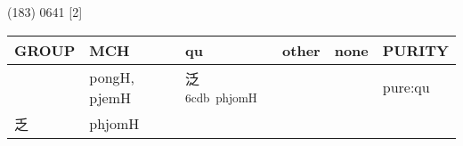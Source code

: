 \documentclass[14pt,a4paper]{scrartcl}
\begin{document}
(183) 0641 {[}2{]}

\begin{longtable}[c]{@{}llllll@{}}
\toprule
\begin{minipage}[b]{0.14\columnwidth}\raggedright\strut
GROUP
\strut\end{minipage} &
\begin{minipage}[b]{0.14\columnwidth}\raggedright\strut
MCH
\strut\end{minipage} &
\begin{minipage}[b]{0.14\columnwidth}\raggedright\strut
qu
\strut\end{minipage} &
\begin{minipage}[b]{0.14\columnwidth}\raggedright\strut
other
\strut\end{minipage} &
\begin{minipage}[b]{0.14\columnwidth}\raggedright\strut
none
\strut\end{minipage} &
\begin{minipage}[b]{0.14\columnwidth}\raggedright\strut
PURITY
\strut\end{minipage}\tabularnewline
\midrule
\endhead
\begin{minipage}[t]{0.14\columnwidth}\raggedright\strut
𢎘
\strut\end{minipage} &
\begin{minipage}[t]{0.14\columnwidth}\raggedright\strut
pongH, pjemH
\strut\end{minipage} &
\begin{minipage}[t]{0.14\columnwidth}\raggedright\strut
泛\textsuperscript{6cdb~phjomH}
\strut\end{minipage} &
\begin{minipage}[t]{0.14\columnwidth}\raggedright\strut
\strut\end{minipage} &
\begin{minipage}[t]{0.14\columnwidth}\raggedright\strut
\strut\end{minipage} &
\begin{minipage}[t]{0.14\columnwidth}\raggedright\strut
pure:qu
\strut\end{minipage}\tabularnewline
\begin{minipage}[t]{0.14\columnwidth}\raggedright\strut
乏
\strut\end{minipage} &
\begin{minipage}[t]{0.14\columnwidth}\raggedright\strut
phjomH
\strut\end{minipage} &
\begin{minipage}[t]{0.14\columnwidth}\raggedright\strut

\end{minipage}
\end{longtable}
\end{document}
